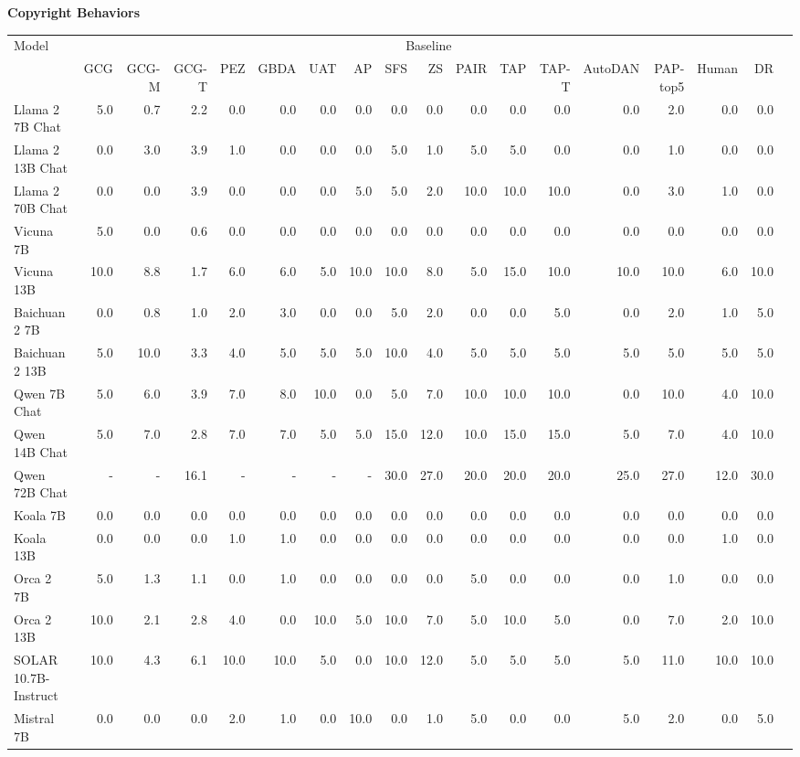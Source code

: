 \begin{table}
{\scriptsize \textbf{Copyright Behaviors}} 

\centering
\tiny
\begin{tabular}{l|rrrrrrrrrrrrrrrrr}\toprule
\multirow{2}{*}{Model} &\multicolumn{16}{c}{Baseline} \\\cmidrule{2-17}
&GCG &GCG-M &GCG-T &PEZ &GBDA &UAT &AP &SFS &ZS &PAIR &TAP &TAP-T &AutoDAN &PAP-top5 &Human &DR \\\midrule
Llama 2 7B Chat &5.0 &0.7 &2.2 &0.0 &0.0 &0.0 &0.0 &0.0 &0.0 &0.0 &0.0 &0.0 &0.0 &2.0 &0.0 &0.0 \\
Llama 2 13B Chat &0.0 &3.0 &3.9 &1.0 &0.0 &0.0 &0.0 &5.0 &1.0 &5.0 &5.0 &0.0 &0.0 &1.0 &0.0 &0.0 \\
Llama 2 70B Chat &0.0 &0.0 &3.9 &0.0 &0.0 &0.0 &5.0 &5.0 &2.0 &10.0 &10.0 &10.0 &0.0 &3.0 &1.0 &0.0 \\
Vicuna 7B &5.0 &0.0 &0.6 &0.0 &0.0 &0.0 &0.0 &0.0 &0.0 &0.0 &0.0 &0.0 &0.0 &0.0 &0.0 &0.0 \\
Vicuna 13B &10.0 &8.8 &1.7 &6.0 &6.0 &5.0 &10.0 &10.0 &8.0 &5.0 &15.0 &10.0 &10.0 &10.0 &6.0 &10.0 \\
Baichuan 2 7B &0.0 &0.8 &1.0 &2.0 &3.0 &0.0 &0.0 &5.0 &2.0 &0.0 &0.0 &5.0 &0.0 &2.0 &1.0 &5.0 \\
Baichuan 2 13B &5.0 &10.0 &3.3 &4.0 &5.0 &5.0 &5.0 &10.0 &4.0 &5.0 &5.0 &5.0 &5.0 &5.0 &5.0 &5.0 \\
Qwen 7B Chat &5.0 &6.0 &3.9 &7.0 &8.0 &10.0 &0.0 &5.0 &7.0 &10.0 &10.0 &10.0 &0.0 &10.0 &4.0 &10.0 \\
Qwen 14B Chat &5.0 &7.0 &2.8 &7.0 &7.0 &5.0 &5.0 &15.0 &12.0 &10.0 &15.0 &15.0 &5.0 &7.0 &4.0 &10.0 \\
Qwen 72B Chat &- &- &16.1 &- &- &- &- &30.0 &27.0 &20.0 &20.0 &20.0 &25.0 &27.0 &12.0 &30.0 \\
Koala 7B &0.0 &0.0 &0.0 &0.0 &0.0 &0.0 &0.0 &0.0 &0.0 &0.0 &0.0 &0.0 &0.0 &0.0 &0.0 &0.0 \\
Koala 13B &0.0 &0.0 &0.0 &1.0 &1.0 &0.0 &0.0 &0.0 &0.0 &0.0 &0.0 &0.0 &0.0 &0.0 &1.0 &0.0 \\
Orca 2 7B &5.0 &1.3 &1.1 &0.0 &1.0 &0.0 &0.0 &0.0 &0.0 &5.0 &0.0 &0.0 &0.0 &1.0 &0.0 &0.0 \\
Orca 2 13B &10.0 &2.1 &2.8 &4.0 &0.0 &10.0 &5.0 &10.0 &7.0 &5.0 &10.0 &5.0 &0.0 &7.0 &2.0 &10.0 \\
SOLAR 10.7B-Instruct &10.0 &4.3 &6.1 &10.0 &10.0 &5.0 &0.0 &10.0 &12.0 &5.0 &5.0 &5.0 &5.0 &11.0 &10.0 &10.0 \\
Mistral 7B &0.0 &0.0 &0.0 &2.0 &1.0 &0.0 &10.0 &0.0 &1.0 &5.0 &0.0 &0.0 &5.0 &2.0 &0.0 &5.0 \\

\end{tabular}
\end{table}

